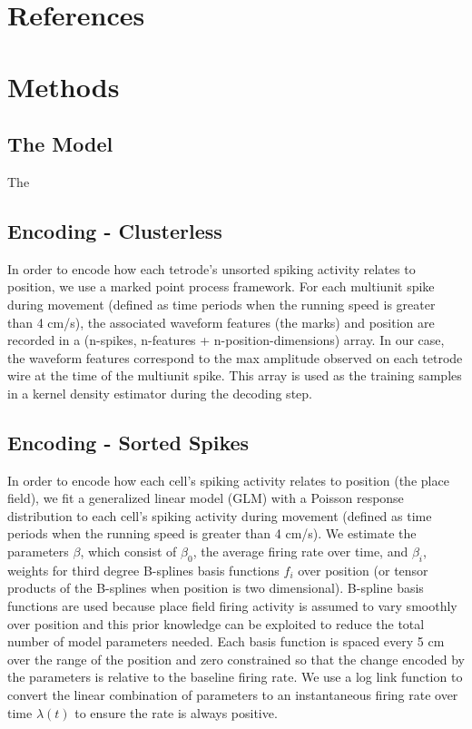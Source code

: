 \documentclass[times, twoside, watermark]{zHenriquesLab-StyleBioRxiv}
\begin{document}
\section*{References}


\onecolumn
\newpage

\section*{Methods}
\subsection*{The Model}
The 

\subsection*{Encoding - Clusterless}
In order to encode how each tetrode's unsorted spiking activity relates to position, we use a marked point process framework. For each multiunit spike during movement (defined as time periods when the running speed is greater than 4 cm/s), the associated waveform features (the marks) and position are recorded in a (n-spikes, n-features + n-position-dimensions) array. In our case, the waveform features correspond to the max amplitude observed on each tetrode wire at the time of the multiunit spike. This array is used as the training samples in a kernel density estimator during the decoding step.

\subsection*{Encoding - Sorted Spikes}
In order to encode how each cell's spiking activity relates to position (the place field), we fit a generalized linear model (GLM) with a Poisson response distribution to each cell's spiking activity during movement (defined as time periods when the running speed is greater than 4 cm/s). We estimate the parameters $\beta$, which consist of $\beta_{0}$, the average firing rate over time, and $\beta_{i}$, weights for third degree B-splines basis functions $f_{i}$ over position (or tensor products of the B-splines when position is two dimensional). B-spline basis functions are used because place field firing activity is assumed to vary smoothly over position and this prior knowledge can be exploited to reduce the total number of model parameters needed. Each basis function is spaced every 5 cm over the range of the position and zero constrained so that the change encoded by the parameters is relative to the baseline firing rate. We use a log link function to convert the linear combination of parameters to an instantaneous firing rate over time $\lambda(t)$ to ensure the rate is always positive. 
\end{document}
